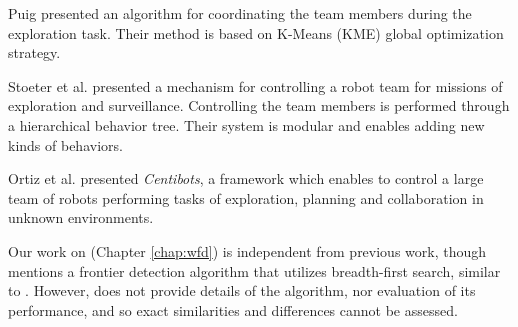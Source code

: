 Puig \cite{puig2010balanced} presented an algorithm for coordinating the
team members during the exploration task. Their method is based on K-Means (KME) global
optimization strategy. 

Stoeter et al. \cite{stoeter2000robot} presented a mechanism for controlling
a robot team for missions of exploration and surveillance. Controlling the team
members is performed through a hierarchical behavior tree. Their system is
modular and enables adding new kinds of behaviors. 

Ortiz et al. \cite{konolige2003large,konolige2006centibots} presented
\emph{Centibots}, a framework which enables to control a large team of robots performing tasks of
exploration, planning and collaboration in unknown environments.   

Our work on \WFD (Chapter \ref{chap:wfd}) is independent from previous work,
though~\cite{Calisi:2007:MES:1291068.1291076} mentions a frontier detection
algorithm that utilizes breadth-first search, similar to \WFD.
However, \cite{Calisi:2007:MES:1291068.1291076} does not provide details of the
algorithm, nor evaluation of its performance, and so exact similarities and
differences cannot be assessed.
